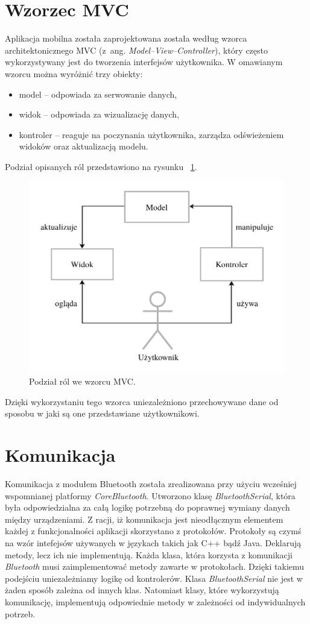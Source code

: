 \section{Wzorzec MVC}
Aplikacja mobilna została zaprojektowana została według wzorca architektonicznego MVC (z~ang. \textit{Model–View–Controller}), który często wykorzystywany jest do tworzenia interfejsów użytkownika. W omawianym wzorcu można wyróżnić trzy obiekty:
\begin{itemize}
\item model – odpowiada za serwowanie danych,
\item widok – odpowiada za wizualizację danych, 
\item kontroler – reaguje na poczynania użytkownika, zarządza odświeżeniem widoków oraz aktualizacją modelu. 
\end{itemize}
Podział opisanych ról przedstawiono na rysunku ~\ref{fig:mvc}.
\begin{figure}[H]
	\centering
		\includegraphics[width=0.75\linewidth]{pic05/mvc.pdf}
	\caption{Podział ról we wzorcu MVC.}
	\label{fig:mvc}	
\end{figure}

Dzięki wykorzystaniu tego wzorca uniezależniono przechowywane dane od sposobu w jaki są one przedstawiane użytkownikowi.

\section{Komunikacja}
Komunikacja z modułem Bluetooth została zrealizowana przy użyciu wcześniej wspomnianej platformy \textit{CoreBluetooth}. Utworzono klasę \textit{BluetoothSerial}, która była odpowiedzialna za całą logikę potrzebną do poprawnej wymiany danych między urządzeniami. Z racji, iż komunikacja jest nieodłącznym elementem każdej z funkcjonalności aplikacji skorzystano z protokołów. Protokoły są czymś na wzór intefejsów używanych w językach takich jak C++ bądź Java. Deklarują metody, lecz ich nie implementują. Każda klasa, która korzysta z komunikacji \textit{Bluetooth} musi zaimplementować metody zawarte w protokołach. Dzięki takiemu podejściu uniezależniamy logikę od kontrolerów. Klasa \textit{BluetoothSerial} nie jest w żaden sposób zależna od innych klas. Natomiast klasy, które wykorzystują komunikację, implementują odpowiednie metody w zależności od indywidualnych potrzeb.

